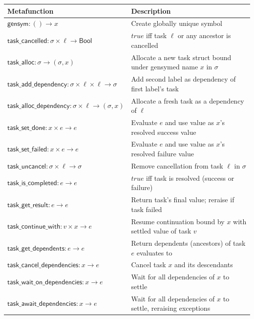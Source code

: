\begin{tabular}{@{}l@{\quad}l@{}}
\toprule
Metafunction & Description \\
\midrule
$\mathsf{gensym} : () \to x$ & Create globally unique symbol \\
$\mathsf{task\_cancelled} : \sigma \times \ell \to \mathsf{Bool}$ & $\mathit{true}$ iff task $\ell$ or any ancestor is cancelled \\
$\mathsf{task\_alloc} : \sigma \to (\sigma, x)$ & Allocate a new task struct bound under gensymed name $x$ in $\sigma$ \\
$\mathsf{task\_add\_dependency} : \sigma \times \ell \times \ell \to \sigma$ & Add second label as dependency of first label's task \\
$\mathsf{task\_alloc\_dependency} : \sigma \times \ell \to (\sigma, x)$ & Allocate a fresh task as a dependency of $\ell$ \\
$\mathsf{task\_set\_done} : x \times e \to e$ & Evaluate $e$ and use value as $x$'s resolved success value \\
$\mathsf{task\_set\_failed} : x \times e \to e$ & Evaluate $e$ and use value as $x$'s resolved failure value \\
$\mathsf{task\_uncancel} : \sigma \times \ell \to \sigma$ & Remove cancellation from task $\ell$ in $\sigma$ \\
$\mathsf{task\_is\_completed} : e \to e$ & $\mathit{true}$ iff task is resolved (success or failure) \\
$\mathsf{task\_get\_result} : e \to e$ & Return task's final value; reraise if task failed \\
$\mathsf{task\_continue\_with} : v \times x \to e$ & Resume continuation bound by $x$ with settled value of task $v$ \\
$\mathsf{task\_get\_dependents} : e \to e$ & Return dependents (ancestors) of task $e$ evaluates to \\
$\mathsf{task\_cancel\_dependencies} : x \to e$ & Cancel task $x$ and its descendants \\
$\mathsf{task\_wait\_on\_dependencies} : x \to e$ & Wait for all dependencies of $x$ to settle \\
$\mathsf{task\_await\_dependencies} : x \to e$ & Wait for all dependencies of $x$ to settle, reraising exceptions \\
\bottomrule
\end{tabular}
